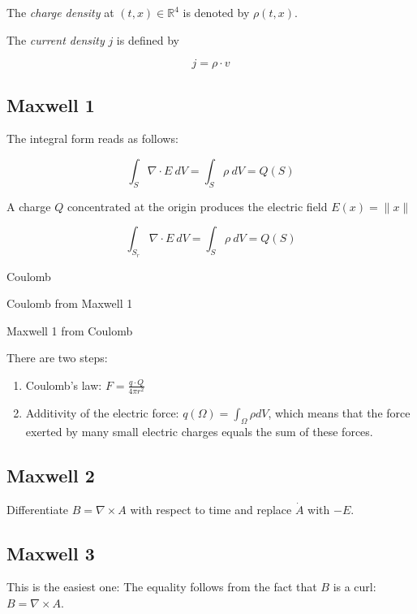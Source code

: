 \documentclass{article}
\begin{document}
The \emph{charge density} at $(t, x) \in \mathbb{R}^4$ is denoted by \(\rho(t, x)\).

The \emph{current density} \(j\) is defined by

\begin{equation}
j = \rho \cdot v
\end{equation}


\subsection{Maxwell 1}

The integral form reads as follows:

\begin{equation}
\label{eq: m1_int_}
\int_S \nabla \cdot E \: dV = \int_{S} \rho \: dV = Q(S)
\end{equation}

A charge $Q$ concentrated at the origin produces the electric field $E(x) = \lVert x \rVert $

\begin{equation}
\label{eq: m1_int}
\int_{S_r} \nabla \cdot E \: dV = \int_{S} \rho \: dV = Q(S)
\end{equation}

Coulomb 

Coulomb from Maxwell 1

Maxwell 1 from Coulomb

There are two steps:
\begin{enumerate}
    \item Coulomb's law: $F = \frac{q \cdot Q}{4\pi r^2}$
    \item Additivity of the electric force: $q(\Omega) = \int_{\Omega} \rho dV$, which means that the force exerted by many small electric charges equals the sum of these forces. 
\end{enumerate}

\subsection{Maxwell 2}

Differentiate $B = \nabla \times A$ with respect to time and replace $\dot A$ with $-E$.

\subsection{Maxwell 3}
This is the easiest one: The equality follows from the fact that $B$ is a curl: $B = \nabla \times A$.
\end{document}
